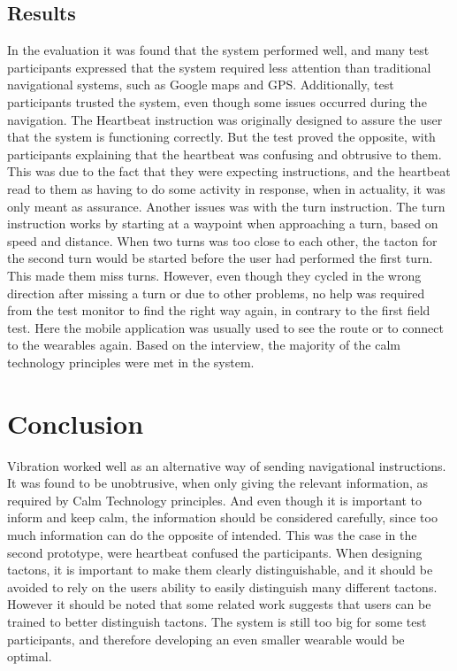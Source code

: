 \documentclass{sigchi}
\begin{document}
\subsection{Results}
In the evaluation it was found that the system performed well, and many test participants expressed that the system required less attention than traditional navigational systems, such as Google maps and GPS. 
\newline
\newline
Additionally, test participants trusted the system, even though some issues occurred during the navigation. The Heartbeat instruction was originally designed to assure the user that the system is functioning correctly. But the test proved the opposite, with participants explaining that the heartbeat was confusing and obtrusive to them. This was due to the fact that they were expecting instructions, and the heartbeat read to them as having to do some activity in response, when in actuality, it was only meant as assurance.
\newline
Another issues was with the turn instruction. The turn instruction works by starting at a waypoint when approaching a turn, based on speed and distance. When two turns was too close to each other, the tacton for the second turn would be started before the user had performed the first turn. This made them miss turns.
\newline
\newline 
However, even though they cycled in the wrong direction after missing a turn or due to other problems, no help was required from the test monitor to find the right way again, in contrary to the first field test.  Here the mobile application was usually used to see the route or to connect to the wearables again. 
\newline
Based on the interview, the majority of the calm technology principles were met in the system. 
\section{Conclusion}
Vibration worked well as an alternative way of sending navigational instructions. It was found to be unobtrusive, when only giving the relevant information, as required by Calm Technology principles. 
And even though it is important to inform and keep calm, the information should be considered carefully, since too much information can do the opposite of intended. This was the case in the second prototype, were heartbeat confused the participants. When designing tactons, it is important to make them clearly distinguishable, and it should be avoided to rely on the users ability to easily distinguish many different tactons. However it should be noted that some related work suggests that users can be trained to better distinguish tactons. 
\newline
The system is still too big for some test participants, and therefore developing an even smaller wearable would be optimal. 
\end{document}
